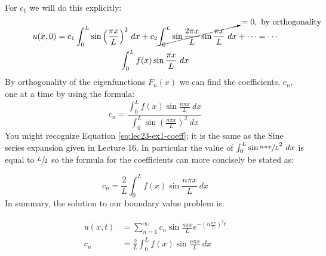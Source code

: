 For $c_1$ we will do this explicitly:
\begin{multline*}
u(x,0) = c_1\int_0^L \sin{\left(\frac{ \pi x}{L}\right)}^2 \ dx + c_2 \cancelto{=0, \ \text{by orthogonality}}{\int_0^L \sin{\frac{ 2\pi x}{L}} \sin{\frac{ \pi x}{L}} \ dx} + \cdots = \cdots \\ \int_0^L f(x) \sin{\frac{ \pi x}{L}} \ dx
\end{multline*}
By orthogonality of the eigenfunctions $F_n(x)$ we can find the coefficients, $c_n$, one at a time by using the formula:
\begin{equation}
c_n = \frac{\int_0^L f(x) \sin{\frac{n \pi x}{L}} \ dx}{\int_0^L \sin{\left(\frac{n \pi x}{L}\right)}^2 \ dx}
\label{eq:lec23-ex1-coeff}
\end{equation}
You might recognize Equation \ref{eq:lec23-ex1-coeff}; it is the same as the Sine series expansion given in Lecture 16. In particular the value of $\int_0^L \sin{\sfrac{n \pi x}{L}}^2 \ dx$ is equal to $\sfrac{L}{2}$ so the formula for the coefficients can more concisely be stated as:

\begin{equation*}
c_n = \frac{2}{L} \int_0^L f(x) \sin{\frac{n \pi x}{L}} \ dx
\end{equation*}
In summary, the solution to our boundary value problem is:

\begin{align*}
u(x,t) &= \sum\limits_{n=1}^{\infty} c_n \sin{\frac{n \pi x}{L}}e^{-(\alpha \frac{n \pi}{L})^2 t} \\
c_n &= \frac{2}{L} \int_0^L f(x) \sin{\frac{n \pi x}{L}} \ dx
\end{align*}

